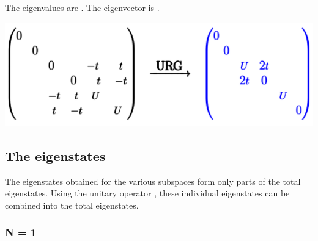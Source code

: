 \documentclass[12pt]{article}
\begin{document}
The eigenvalues are . The eigenvector is .

\begin{center}
	\includegraphics[scale=0.3]{pic2.png}
\end{center}

\subsection{The eigenstates}
The eigenstates obtained for the various subspaces form only parts of the total eigenstates. Using the unitary operator , these individual eigenstates can be combined into the total eigenstates.

\subsubsection{N = 1}
\end{document}
